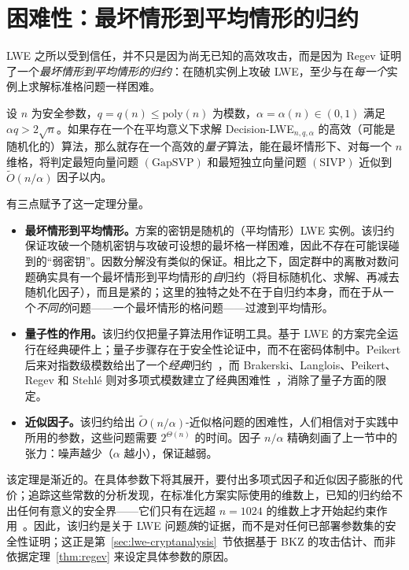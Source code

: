 \section{困难性：最坏情形到平均情形的归约}

LWE 之所以受到信任，并不只是因为尚无已知的高效攻击，而是因为 Regev 证明了一个\emph{最坏情形到平均情形的归约}：在随机实例上攻破 LWE，至少与在\emph{每一个}实例上求解标准格问题一样困难。

\begin{theorem}
\label{thm:regev}
设 $n$ 为安全参数，$q=q(n)\le\mathrm{poly}(n)$ 为模数，$\alpha=\alpha(n)\in(0,1)$ 满足 $\alpha q>2\sqrt{n}$。如果存在一个在平均意义下求解 Decision-LWE$_{n,q,\alpha}$ 的高效（可能是随机化的）算法，那么就存在一个高效的\emph{量子}算法，能在最坏情形下、对每一个 $n$ 维格，将判定最短向量问题 $(\mathrm{GapSVP})$ 和最短独立向量问题 $(\mathrm{SIVP})$ 近似到 $\widetilde{O}(n/\alpha)$ 因子以内。
\end{theorem}

有三点赋予了这一定理分量。

\begin{itemize}
  \item \textbf{最坏情形到平均情形。}方案的密钥是随机的（平均情形）LWE 实例。该归约保证攻破一个随机密钥与攻破可设想的最坏格一样困难，因此不存在可能误碰到的“弱密钥”。因数分解没有类似的保证。相比之下，固定群中的离散对数问题确实具有一个最坏情形到平均情形的\emph{自}归约（将目标随机化、求解、再减去随机化因子），而且是紧的；这里的独特之处不在于自归约本身，而在于从一个\emph{不同的}问题——一个最坏情形的格问题——过渡到平均情形。
  \item \textbf{量子性的作用。}该归约仅把量子算法用作证明工具。基于 LWE 的方案完全运行在经典硬件上；量子步骤存在于安全性论证中，而不在密码体制中。Peikert 后来对指数级模数给出了一个\emph{经典}归约~\cite{peikert2009}，而 Brakerski、Langlois、Peikert、Regev 和 Stehl\'{e} 则对多项式模数建立了经典困难性~\cite{blprs2013}，消除了量子方面的限定。
  \item \textbf{近似因子。}该归约给出 $\widetilde{O}(n/\alpha)$-近似格问题的困难性，人们相信对于实践中所用的参数，这些问题需要 $2^{\Theta(n)}$ 的时间。因子 $n/\alpha$ 精确刻画了上一节中的张力：噪声越少（$\alpha$ 越小），保证越弱。
\end{itemize}

\begin{remark}[该归约在部署规模下能保证什么]
该定理是渐近的。在具体参数下将其展开，要付出多项式因子和近似因子膨胀的代价；追踪这些常数的分析发现，在标准化方案实际使用的维数上，已知的归约给不出任何有意义的安全界——它们只有在远超 $n=1024$ 的维数上才开始起约束作用~\cite{gartner2023}。因此，该归约是关于 LWE 问题\emph{族}的证据，而不是对任何已部署参数集的安全性证明；这正是第~\ref{sec:lwe-cryptanalysis}~节依据基于 BKZ 的攻击估计、而非依据定理~\ref{thm:regev} 来设定具体参数的原因。
\end{remark}

